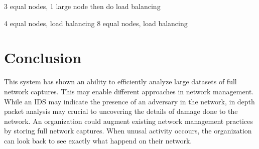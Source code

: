 \documentclass{article}
\begin{document}
\begin{multicols}{2}
3 equal nodes, 1 large node
then do load balancing

4 equal nodes, load balancing
8 equal nodes, load balancing





\section*{Conclusion}

This system has shown an ability to efficiently analyze large datasets of full network captures. This may enable different approaches in network management.  While an IDS may indicate the presence of an adversary in the network, in depth packet analysis may crucial to uncovering the details of damage done to the network.  An organization could augment existing network management practices by storing full network captures.  When unusal activity occours, the organization can look back to see exactly what happend on their network.  

\end{multicols}
\end{document}
